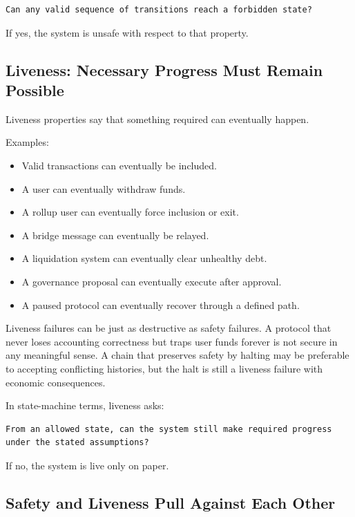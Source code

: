 \begin{lstlisting}
Can any valid sequence of transitions reach a forbidden state?
\end{lstlisting}

If yes, the system is unsafe with respect to that property.

\subsection{Liveness: Necessary Progress Must Remain Possible}

Liveness properties say that something required can eventually happen.

Examples:

\begin{itemize}
\tightlist
\item
  Valid transactions can eventually be included.
\item
  A user can eventually withdraw funds.
\item
  A rollup user can eventually force inclusion or exit.
\item
  A bridge message can eventually be relayed.
\item
  A liquidation system can eventually clear unhealthy debt.
\item
  A governance proposal can eventually execute after approval.
\item
  A paused protocol can eventually recover through a defined path.
\end{itemize}

Liveness failures can be just as destructive as safety failures. A
protocol that never loses accounting correctness but traps user funds
forever is not secure in any meaningful sense. A chain that preserves
safety by halting may be preferable to accepting conflicting histories,
but the halt is still a liveness failure with economic consequences.

In state-machine terms, liveness asks:

\begin{lstlisting}
From an allowed state, can the system still make required progress
under the stated assumptions?
\end{lstlisting}

If no, the system is live only on paper.

\subsection{Safety and Liveness Pull Against Each Other}

